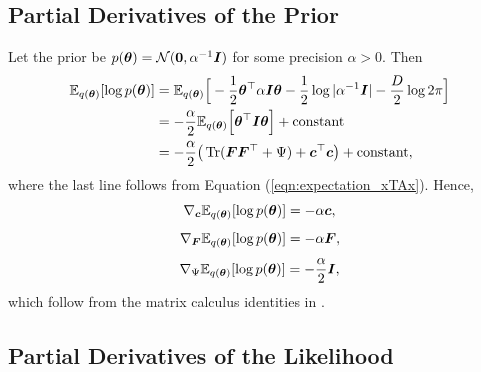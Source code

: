 \documentclass[10pt]{article} %
\newcommand{\tr}{\mathop{\mathrm{Tr}}}
\begin{document}
\subsection{Partial Derivatives of the Prior}

Let the prior be $p({\bm{\theta}}) = \mathcal{N}(\bm{0}, \alpha^{-1} {\bm{I}})$ for some precision $\alpha > 0$. Then
\begin{align}
\begin{split}
	\E_{q(\vtheta)} [\log p(\vtheta)]
	& = \E_{q(\vtheta)} \Big[-\frac{1}{2} \vtheta^\top \alpha \mI \vtheta  - \frac{1}{2} \log |\alpha^{-1} \mI| - \frac{D}{2} \log 2\pi\Big] \\
	& = -\frac{\alpha}{2} \E_{q(\vtheta)} \Big[ \vtheta^\top \mI \vtheta \Big] + \text{constant} \\
	& = -\frac{\alpha}{2}\big( \tr(\mF \mF^{\top} + \Psi) + \vc^\top \vc \big)+ \text{constant},
\end{split}
\end{align}
where the last line follows from Equation (\ref{eqn:expectation_xTAx}). Hence, 
\begin{equation}
\nabla_{\bm{c}} \mathbb{E}_{q({\bm{\theta}})} [\log p({\bm{\theta}})] = -\alpha {\bm{c}},
\end{equation}
\begin{equation}
\nabla_{\bm{F}} \mathbb{E}_{q({\bm{\theta}})} [\log p({\bm{\theta}})] = -\alpha {\bm{F}},
\end{equation}
\begin{equation}\label{eqn:grad_prior_wrt_psi}
\nabla_\Psi \mathbb{E}_{q({\bm{\theta}})} [\log p({\bm{\theta}})] = -\frac{\alpha}{2} {\bm{I}},
\end{equation}
which follow from the matrix calculus identities in \citep{petersen2012}.

\subsection{Partial Derivatives of the Likelihood}
\end{document}
